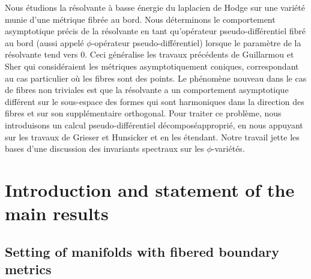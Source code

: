 \documentclass[JEP,XML,SOM,Unicode,NoFloatCountersInSection,published]{cedram}
\theoremstyle{plain}
\theoremstyle{definition}
\begin{document}


\begin{altabstract}
Nous étudions la résolvante à basse énergie du laplacien de Hodge sur une variété munie d'une métrique fibrée au bord. Nous déterminons le comportement asymptotique précis de la résolvante en tant qu'opérateur pseudo-différentiel fibré au bord (aussi appelé $\phi$-opérateur pseudo-différentiel) lorsque le paramètre de la résolvante tend vers $0$. Ceci généralise les travaux précédents de Guillarmou et Sher qui considéraient les métriques asymptotiquement coniques, correspondant au cas particulier où les fibres sont des points. Le phénomène nouveau dans le cas de fibres non triviales est que la résolvante a un comportement asymptotique différent sur le sous-espace des formes qui sont harmoniques dans la direction des fibres et sur son supplémentaire orthogonal. Pour traiter ce problème, nous introduisons un calcul pseudo-différentiel \og décomposé\fg approprié, en nous appuyant sur les travaux de Grieser et Hunsicker et en les étendant. Notre travail jette les bases d'une discussion des invariants spectraux sur les $\phi$-variétés.
\end{altabstract}

\maketitle
\tableofcontents
\mainmatter

\section{Introduction and statement of the main results}

\subsection{Setting of manifolds with fibered boundary metrics}
\end{document}
